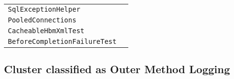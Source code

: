 \begin{center}
\begin{tabular}{ll}
\lstinline/SqlExceptionHelper/&\raisebox{0pt}{\lstinline/logExceptions(SQLExceptionsql,String)/}\\
\lstinline/PooledConnections/&\raisebox{0pt}{\lstinline/close(/}\\
\lstinline/CacheableHbmXmlTest/&\raisebox{0pt}{\lstinline/createBinFile()/}\\
\lstinline/BeforeCompletionFailureTest/&\raisebox{0pt}{\lstinline/testUniqueConstraintViolationDuringManagedFlush()/}\\ 
\bottomrule
\end{tabular}
\end{center}

\subsection{Cluster classified as Outer Method Logging}

